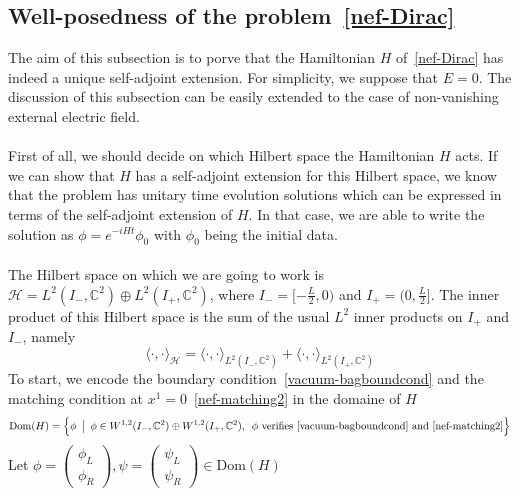 \subsection{Well-posedness of the problem~\cref{nef-Dirac}}\label{vacuum-subsect-sa}
The aim of this subsection is to porve that the Hamiltonian $H$ of~\cref{nef-Dirac} has indeed a unique self-adjoint extension.
For simplicity, 
we suppose that $E = 0$.
The discussion of this subsection can be easily extended to the case of non-vanishing external electric field.\\\\
First of all, we should decide on which Hilbert space the Hamiltonian $H$ acts.
If we can show that $H$ has a self-adjoint extension for this Hilbert space, 
we know that the problem has unitary time evolution solutions which can be expressed in terms of the self-adjoint extension of $H$.
In that case, we are able to write the solution as $\phi =  e^{-iHt}\phi_0$ with $\phi_0$ being the initial data.
\\\\
%
The Hilbert space on which we are going to work is $\mathcal{H} = L^{2}(I_-, \mathbb{C}^2) \oplus L^{2}(I_+, \mathbb{C}^2)$,  where $I_- = [-\frac{L}{2}, 0)$ and $I_+ = (0, \frac{L}{2}]$.
The inner product of this Hilbert space is the sum of the usual $L^2$ inner products on $I_+$ and $I_-$, namely
\begin{equation*}
\langle \cdot, \cdot\rangle_{\mathcal{H} } = \langle \cdot, \cdot\rangle_{L^{2}(I_-, \mathbb{C}^2)} +\langle \cdot, \cdot\rangle_{L^{2}(I_+, \mathbb{C}^2)}
\end{equation*}
To start, we encode the boundary condition~\cref{vacuum-bagboundcond} and the matching condition at $x^1 = 0$~\cref{nef-matching2} in the domaine of $H$ 
\begin{equation*}
\mathrm{Dom}(H) = \Big \{\phi \enskip \big\vert \enskip \phi \in W^{1,2}(I_-, \mathbb{C}^2) \oplus W^{1,2}(I_+, \mathbb{C}^2), \enskip \phi \textrm{ verifies~\cref{vacuum-bagboundcond} and~\cref{nef-matching2}} \Big \}
\end{equation*} 
Let $ \phi = \begin{pmatrix} \phi_L \\ \phi_R \end{pmatrix}, \psi = \begin{pmatrix} \psi_L \\ \psi_R \end{pmatrix} \in \mathrm{Dom}(H)$
